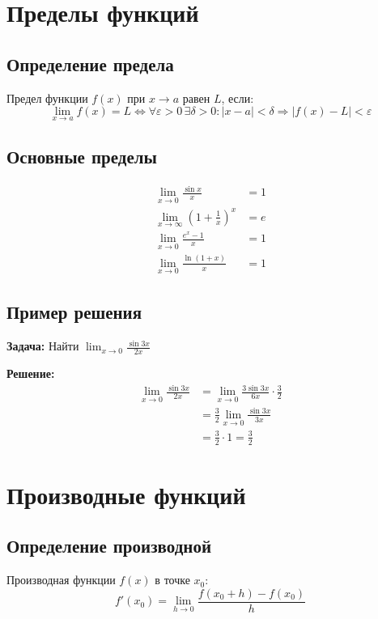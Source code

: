 \documentclass[12pt,a4paper]{report}
\begin{document}
\chapter{Пределы функций}

\section{Определение предела}
Предел функции $f(x)$ при $x \to a$ равен $L$, если:
\begin{equation}
\lim_{x \to a} f(x) = L \iff \forall \varepsilon > 0 \, \exists \delta > 0 : |x - a| < \delta \Rightarrow |f(x) - L| < \varepsilon
\end{equation}

\section{Основные пределы}
\begin{align}
\lim_{x \to 0} \frac{\sin x}{x} &= 1 \\
\lim_{x \to \infty} \left(1 + \frac{1}{x}\right)^x &= e \\
\lim_{x \to 0} \frac{e^x - 1}{x} &= 1 \\
\lim_{x \to 0} \frac{\ln(1 + x)}{x} &= 1
\end{align}

\section{Пример решения}
\textbf{Задача:} Найти $\lim_{x \to 0} \frac{\sin 3x}{2x}$

\textbf{Решение:}
\begin{align}
\lim_{x \to 0} \frac{\sin 3x}{2x} &= \lim_{x \to 0} \frac{3 \sin 3x}{6x} \cdot \frac{3}{2} \\
&= \frac{3}{2} \lim_{x \to 0} \frac{\sin 3x}{3x} \\
&= \frac{3}{2} \cdot 1 = \frac{3}{2}
\end{align}

\chapter{Производные функций}

\section{Определение производной}
Производная функции $f(x)$ в точке $x_0$:
\begin{equation}
f'(x_0) = \lim_{h \to 0} \frac{f(x_0 + h) - f(x_0)}{h}
\end{equation}
\end{document}
